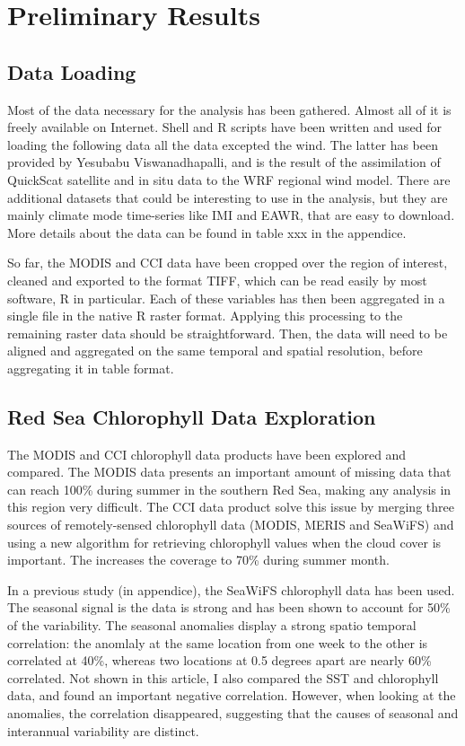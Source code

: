 \chapter{Preliminary Results}

\section{Data Loading}

Most of the data necessary for the analysis has been gathered. Almost all of it is freely available on Internet. Shell and R scripts have been written and used for loading the following data all the data excepted the wind. The latter has been provided by Yesubabu Viswanadhapalli, and is the result of the assimilation of QuickScat satellite and in situ data to the WRF regional wind model. There are additional datasets that could be interesting to use in the analysis, but they are mainly climate mode time-series like IMI and EAWR, that are easy to download. More details about the data can be found in table xxx in the appendice.

So far, the MODIS and CCI data have been cropped over the region of interest, cleaned and exported to the format TIFF, which can be read easily by most software, R in particular. Each of these variables has then been aggregated in a single file in the native R raster format. Applying this processing to the remaining raster data should be straightforward. Then, the data will need to be aligned and aggregated on the same temporal and spatial resolution, before aggregating it in table format.

\section{Red Sea Chlorophyll Data Exploration}

The MODIS and CCI chlorophyll data products have been explored and compared. The MODIS data presents an important amount of missing data that can reach 100\% during summer in the southern Red Sea, making any analysis in this region very difficult. The CCI data product solve this issue by merging three sources of remotely-sensed chlorophyll data (MODIS, MERIS and SeaWiFS) and using a new algorithm for retrieving chlorophyll values when the cloud cover is important. The increases the coverage to 70\% during summer month.

In a previous study (in appendice), the SeaWiFS chlorophyll data has been used. The seasonal signal is the data is strong and has been shown to account for 50\% of the variability. The seasonal anomalies display a strong spatio temporal correlation: the anomlaly at the same location from one week to the other is correlated at 40\%, whereas two locations at 0.5 degrees apart are nearly 60\% correlated. Not shown in this article, I also compared the SST and chlorophyll data, and found an important negative correlation. However, when looking at the anomalies, the correlation disappeared, suggesting that the causes of seasonal and interannual variability are distinct.
 

